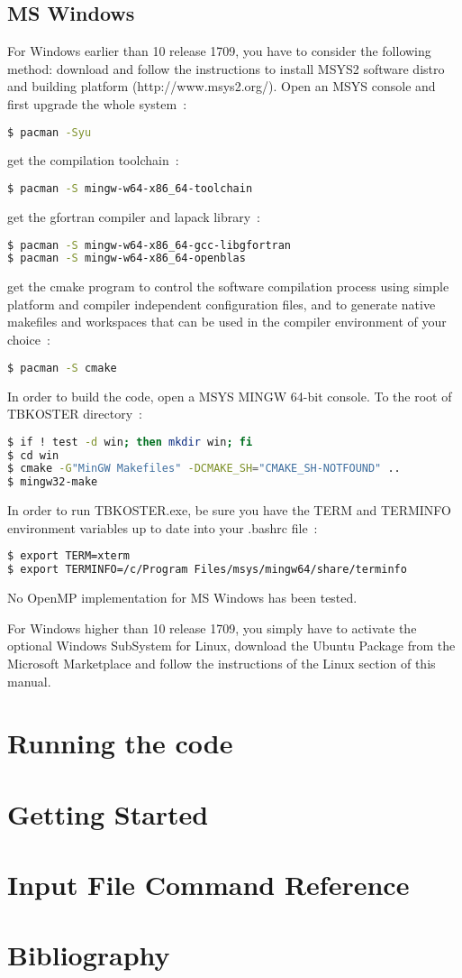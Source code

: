\documentclass[12pt, onecolumn]{memoir}
\begin{document}
\section{MS Windows}
For Windows earlier than 10 release 1709, you have to consider the following method:
download and follow the instructions to install MSYS2 software distro and building platform (http://www.msys2.org/). Open an MSYS console and first upgrade the whole system~:
\begin{lstlisting}[language=sh,basicstyle=\small]
$ pacman -Syu
\end{lstlisting}
get the compilation toolchain~:
\begin{lstlisting}[language=sh,basicstyle=\small]
$ pacman -S mingw-w64-x86_64-toolchain
\end{lstlisting}
get the gfortran compiler and lapack library~:
\begin{lstlisting}[language=sh,basicstyle=\small]
$ pacman -S mingw-w64-x86_64-gcc-libgfortran
$ pacman -S mingw-w64-x86_64-openblas
\end{lstlisting}
get the cmake program to control the software compilation process using simple platform and compiler independent configuration files, and to generate native makefiles and workspaces that can be used in the compiler environment of your choice~:
\begin{lstlisting}[language=bash,basicstyle=\small]
$ pacman -S cmake
\end{lstlisting}

In order to build the code, open a MSYS MINGW 64-bit console. To the root of TBKOSTER directory~:
\begin{lstlisting}[language=sh,basicstyle=\small]
$ if ! test -d win; then mkdir win; fi
$ cd win
$ cmake -G"MinGW Makefiles" -DCMAKE_SH="CMAKE_SH-NOTFOUND" ..
$ mingw32-make
\end{lstlisting}
In order to run TBKOSTER.exe, be sure you have the TERM and TERMINFO environment variables up to date into your .bashrc file~:
\begin{lstlisting}[language=sh,basicstyle=\small]
$ export TERM=xterm
$ export TERMINFO=/c/Program Files/msys/mingw64/share/terminfo
\end{lstlisting}
No OpenMP implementation for MS Windows has been tested.

For Windows higher than 10 release 1709, you simply have to activate the optional Windows SubSystem for Linux, download the Ubuntu Package from the Microsoft Marketplace and follow the instructions of the Linux section of this manual.

\chapter{Running the code}
\chapter{Getting Started}
\chapter{Input File Command Reference}
\chapter*{Bibliography}
% 
% 
\appendix
\backmatter
\end{document}
